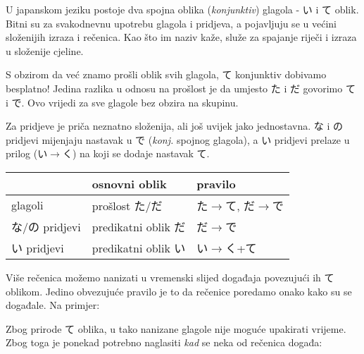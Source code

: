 

\author{Tomislav Mamić}


	
	
	U japanskom jeziku postoje dva spojna oblika (\textit{konjunktiv}) glagola - い i て oblik. Bitni su za svakodnevnu upotrebu glagola i pridjeva, a pojavljuju se u većini složenijih izraza i rečenica. Kao što im naziv kaže, služe za spajanje riječi i izraza u složenije cjeline.
	
	
	S obzirom da već znamo prošli oblik svih glagola, て konjunktiv dobivamo besplatno! Jedina razlika u odnosu na prošlost je da umjesto た i だ govorimo て i で. Ovo vrijedi za sve glagole bez obzira na skupinu.
	
	Za pridjeve je priča neznatno složenija, ali još uvijek jako jednostavna. な i の pridjevi mijenjaju nastavak u で (\textit{konj.} spojnog glagola), a い pridjevi prelaze u prilog (い$\rightarrow$く) na koji se dodaje nastavak て.
	
	\vspace{10pt}
	\begin{tabular}{|l|l|l|}
		\hline
		&osnovni oblik&pravilo\\\hline
		glagoli&prošlost た/だ&た$\rightarrow$て, だ$\rightarrow$で\\\hline
		な/の pridjevi&predikatni oblik だ&だ$\rightarrow$で\\\hline
		い pridjevi&predikatni oblik い&い$\rightarrow$く+て\\\hline
	\end{tabular}

	
	Više rečenica možemo nanizati u vremenski slijed događaja povezujući ih て oblikom. Jedino obvezujuće pravilo je to da rečenice poredamo onako kako su se događale. Na primjer:
	
	\begin{reibun}
	\end{reibun}

	Zbog prirode て oblika, u tako nanizane glagole nije moguće upakirati vrijeme. Zbog toga je ponekad potrebno naglasiti \textit{kad} se neka od rečenica događa:
	
